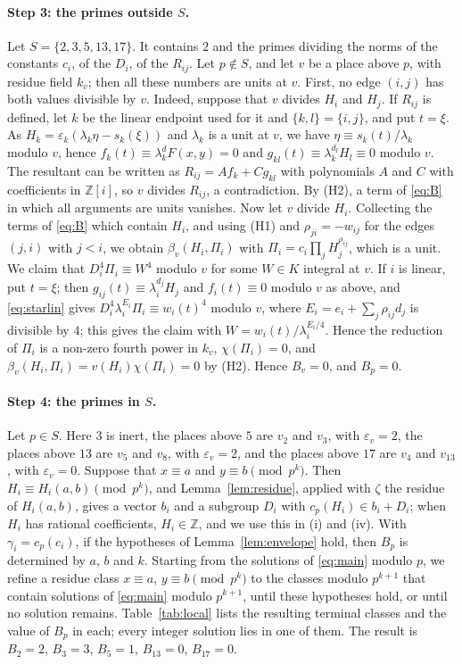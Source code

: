 \documentclass[11pt]{article}
\newcommand{\Z}{\mathbb{Z}}
\begin{document}
\paragraph{Step 3: the primes outside $S$.} Let $S=\{2,3,5,13,17\}$. It contains $2$ and the primes dividing the norms of the constants $c_i$, of the $D_i$, of the $R_{ij}$. Let $p\notin S$, and let $v$ be a place above $p$, with residue field $k_v$; then all these numbers are units at $v$. First, no edge $(i,j)$ has both values divisible by $v$. Indeed, suppose that $v$ divides $H_i$ and $H_j$. If $R_{ij}$ is defined, let $k$ be the linear endpoint used for it and $\{k,l\}=\{i,j\}$, and put $t=\xi$. As $H_k=\varepsilon_k(\lambda_k\eta-s_k(\xi))$ and $\lambda_k$ is a unit at $v$, we have $\eta\equiv s_k(t)/\lambda_k$ modulo $v$, hence $f_k(t)\equiv\lambda_k^dF(x,y)=0$ and $g_{kl}(t)\equiv\lambda_k^{d_l}H_l\equiv0$ modulo $v$. The resultant can be written as $R_{ij}=Af_k+Cg_{kl}$ with polynomials $A$ and $C$ with coefficients in $\Z[i]$, so $v$ divides $R_{ij}$, a contradiction. By (H2), a term of \eqref{eq:B} in which all arguments are units vanishes. Now let $v$ divide $H_i$. Collecting the terms of \eqref{eq:B} which contain $H_i$, and using (H1) and $\rho_{ji}=-w_{ij}$ for the edges $(j,i)$ with $j<i$, we obtain $\beta_v(H_i,\Pi_i)$ with $\Pi_i=c_i\prod_jH_j^{\rho_{ij}}$, which is a unit. We claim that $D_i^4\Pi_i\equiv W^4$ modulo $v$ for some $W\in K$ integral at $v$. If $i$ is linear, put $t=\xi$; then $g_{ij}(t)\equiv\lambda_i^{d_j}H_j$ and $f_i(t)\equiv0$ modulo $v$ as above, and \eqref{eq:starlin} gives $D_i^4\lambda_i^{E_i}\Pi_i\equiv w_i(t)^4$ modulo $v$, where $E_i=e_i+\sum_j\rho_{ij}d_j$ is divisible by $4$; this gives the claim with $W=w_i(t)/\lambda_i^{E_i/4}$. Hence the reduction of $\Pi_i$ is a non-zero fourth power in $k_v$, $\chi(\Pi_i)=0$, and $\beta_v(H_i,\Pi_i)=v(H_i)\chi(\Pi_i)=0$ by (H2). Hence $B_v=0$, and $B_p=0$.

\paragraph{Step 4: the primes in $S$.} Let $p\in S$. Here $3$ is inert, the places above $5$ are $v_{2}$ and $v_{3}$, with $\varepsilon_v=2$, the places above $13$ are $v_{5}$ and $v_{8}$, with $\varepsilon_v=2$, and the places above $17$ are $v_{4}$ and $v_{13}$, with $\varepsilon_v=0$. Suppose that $x\equiv a$ and $y\equiv b\pmod{p^k}$. Then $H_i\equiv H_i(a,b)\pmod{p^k}$, and Lemma~\ref{lem:residue}, applied with $\zeta$ the residue of $H_i(a,b)$, gives a vector $b_i$ and a subgroup $D_i$ with $c_p(H_i)\in b_i+D_i$; when $H_i$ has rational coefficients, $H_i\in\Z$, and we use this in (i) and (iv). With $\gamma_i=c_p(c_i)$, if the hypotheses of Lemma~\ref{lem:envelope} hold, then $B_p$ is determined by $a$, $b$ and $k$. Starting from the solutions of \eqref{eq:main} modulo $p$, we refine a residue class $x\equiv a$, $y\equiv b\pmod{p^k}$ to the classes modulo $p^{k+1}$ that contain solutions of \eqref{eq:main} modulo $p^{k+1}$, until these hypotheses hold, or until no solution remains. Table~\ref{tab:local} lists the resulting terminal classes and the value of $B_p$ in each; every integer solution lies in one of them. The result is $B_{2}=2$, $B_{3}=3$, $B_{5}=1$, $B_{13}=0$, $B_{17}=0$.
\end{document}
